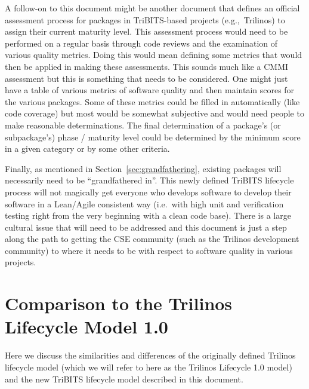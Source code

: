 \documentclass[11pt]{SANDreport}
\begin{document}
A follow-on to this document might be another document that defines an
official assessment process for packages in TriBITS-based projects
(e.g.,\ Trilinos) to assign their current maturity level.  This
assessment process would need to be performed on a regular basis
through code reviews and the examination of various quality metrics.
Doing this would mean defining some metrics that would then be applied
in making these assessments. This sounds much like a CMMI assessment
but this is something that needs to be considered.  One might just
have a table of various metrics of software quality and then maintain
scores for the various packages.  Some of these metrics could be
filled in automatically (like code coverage) but most would be
somewhat subjective and would need people to make reasonable
determinations.  The final determination of a package's (or
subpackage's) phase / maturity level could be determined by the
minimum score in a given category or by some other criteria.

Finally, as mentioned in Section~\ref{sec:grandfathering}, existing
packages will necessarily need to be ``grandfathered in''.  This newly
defined TriBITS lifecycle process will not magically get everyone who
develops software to develop their software in a Lean/Agile consistent
way (i.e.\ with high unit and verification testing right from the very
beginning with a clean code base).  There is a large cultural issue
that will need to be addressed and this document is just a step along
the path to getting the CSE community (such as the Trilinos development
community) to where it needs to be with respect to software quality in
various projects.


%
\clearpage




\appendix

%
\section{Comparison to the Trilinos Lifecycle Model 1.0}
\label{sec:compare_with_lifecycle_1.0_model}
%

Here we discuss the similarities and differences of the originally
defined Trilinos lifecycle model {}\cite{TrilinosLifecycleModel2007}
(which we will refer to here as the Trilinos Lifecycle 1.0 model) and the
new TriBITS lifecycle model described in this document.
\end{document}
